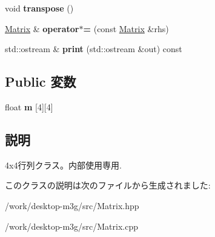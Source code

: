 \begin{CompactItemize}
\item 
\hypertarget{classm3g_1_1Matrix_f3a99ffb20127be48232d12260e934dc}{
void \textbf{transpose} ()}
\label{classm3g_1_1Matrix_f3a99ffb20127be48232d12260e934dc}

\item 
\hypertarget{classm3g_1_1Matrix_5d28596666a27f88d74bacceaef9b326}{
\hyperlink{classm3g_1_1Matrix}{Matrix} \& \textbf{operator$\ast$=} (const \hyperlink{classm3g_1_1Matrix}{Matrix} \&rhs)}
\label{classm3g_1_1Matrix_5d28596666a27f88d74bacceaef9b326}

\item 
\hypertarget{classm3g_1_1Matrix_6fea17fa1532df3794f8cb39cb4f911f}{
std::ostream \& \textbf{print} (std::ostream \&out) const }
\label{classm3g_1_1Matrix_6fea17fa1532df3794f8cb39cb4f911f}

\end{CompactItemize}
\subsection*{Public 変数}
\begin{CompactItemize}
\item 
\hypertarget{classm3g_1_1Matrix_7cdab8754cd800b1ba4008e559aa314c}{
float \textbf{m} \mbox{[}4\mbox{]}\mbox{[}4\mbox{]}}
\label{classm3g_1_1Matrix_7cdab8754cd800b1ba4008e559aa314c}

\end{CompactItemize}


\subsection{説明}
4x4行列クラス。内部使用専用. 

このクラスの説明は次のファイルから生成されました:\begin{CompactItemize}
\item 
/work/desktop-m3g/src/Matrix.hpp\item 
/work/desktop-m3g/src/Matrix.cpp\end{CompactItemize}
